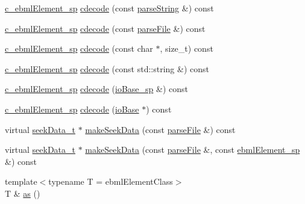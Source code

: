 \begin{DoxyCompactItemize}
\item 
\mbox{\hyperlink{namespaceebml_a2deef4e8071531b32e3533f1bf978917}{c\+\_\+ebml\+Element\+\_\+sp}} \mbox{\hyperlink{classebml_1_1ebmlElementClass_ad44d7844db705e5e1d8c35a780b58486}{cdecode}} (const \mbox{\hyperlink{classebml_1_1parseString}{parse\+String}} \&) const
\item 
\mbox{\hyperlink{namespaceebml_a2deef4e8071531b32e3533f1bf978917}{c\+\_\+ebml\+Element\+\_\+sp}} \mbox{\hyperlink{classebml_1_1ebmlElementClass_a6a6432b7bf633821f27015e111928b15}{cdecode}} (const \mbox{\hyperlink{classebml_1_1parseFile}{parse\+File}} \&) const
\item 
\mbox{\hyperlink{namespaceebml_a2deef4e8071531b32e3533f1bf978917}{c\+\_\+ebml\+Element\+\_\+sp}} \mbox{\hyperlink{classebml_1_1ebmlElementClass_ab365b1b7024bbf0dd625694a71f7e7ba}{cdecode}} (const char $\ast$, size\+\_\+t) const
\item 
\mbox{\hyperlink{namespaceebml_a2deef4e8071531b32e3533f1bf978917}{c\+\_\+ebml\+Element\+\_\+sp}} \mbox{\hyperlink{classebml_1_1ebmlElementClass_a2696f361d3cf6f1f544657266ad21808}{cdecode}} (const std\+::string \&) const
\item 
\mbox{\hyperlink{namespaceebml_a2deef4e8071531b32e3533f1bf978917}{c\+\_\+ebml\+Element\+\_\+sp}} \mbox{\hyperlink{classebml_1_1ebmlElementClass_a01de47338b3df5a666b989d9d85fa1d5}{cdecode}} (\mbox{\hyperlink{namespaceebml_a7bb59128ac6af27e47367938a846b569}{io\+Base\+\_\+sp}} \&) const
\item 
\mbox{\hyperlink{namespaceebml_a2deef4e8071531b32e3533f1bf978917}{c\+\_\+ebml\+Element\+\_\+sp}} \mbox{\hyperlink{classebml_1_1ebmlElementClass_a583586c72ae328913f0a920843d46677}{cdecode}} (\mbox{\hyperlink{classebml_1_1ioBase}{io\+Base}} $\ast$) const
\item 
virtual \mbox{\hyperlink{classebml_1_1seekData__t}{seek\+Data\+\_\+t}} $\ast$ \mbox{\hyperlink{classebml_1_1ebmlElementClass_a211de9c10948a2b4a6b3550eb76c1102}{make\+Seek\+Data}} (const \mbox{\hyperlink{classebml_1_1parseFile}{parse\+File}} \&) const
\item 
virtual \mbox{\hyperlink{classebml_1_1seekData__t}{seek\+Data\+\_\+t}} $\ast$ \mbox{\hyperlink{classebml_1_1ebmlElementClass_ac844edef1226b728c127cdf946b3d152}{make\+Seek\+Data}} (const \mbox{\hyperlink{classebml_1_1parseFile}{parse\+File}} \&, const \mbox{\hyperlink{namespaceebml_adad533b7705a16bb360fe56380c5e7be}{ebml\+Element\+\_\+sp}} \&) const
\item 
{\footnotesize template$<$typename T  = ebml\+Element\+Class$>$ }\\T \& \mbox{\hyperlink{classebml_1_1ebmlElementClass_ab8c68b1f0a25aead5003d7100a27d5d3}{as}} ()

\end{DoxyCompactItemize}
